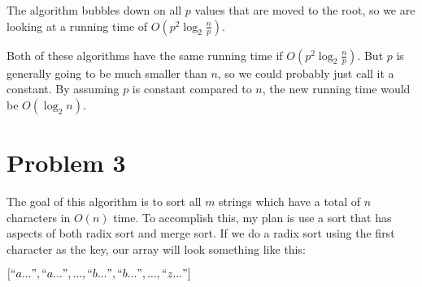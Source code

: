 \documentclass[a4paper,12pt]{article}
\begin{document}
The algorithm bubbles down on all $p$ values that are moved to the
root, so we are looking at a running time of
$O(p^2\log_2\frac{n}{p})$.


Both of these algorithms have the same running time if
$O(p^2\log_2\frac{n}{p})$. But $p$ is generally going to be much
smaller than $n$, so we could probably just call it a constant. By
assuming $p$ is constant compared to $n$, the new running time would
be $O(\log_2n)$.

\section*{Problem 3}

The goal of this algorithm is to sort all $m$ strings which have a
total of $n$ characters in $O(n)$ time. To accomplish this, my plan is
use a sort that has aspects of both radix sort and merge sort. 
\newline \newline
If we do a radix sort using the first character as the key, our array
will look something like this:

\begin{center}
  
$\left[
``a...",
``a...",
... ,
``b..." ,
``b..." ,
... ,
``z..."
\right]$
    
\end{center}
\end{document}
